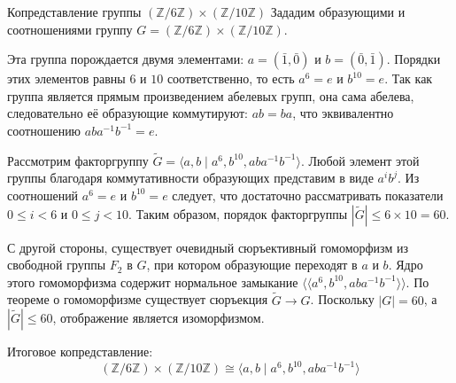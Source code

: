 \begin{Example}{Копредставление группы $(\mathbb{Z}/6\mathbb{Z}) \times (\mathbb{Z}/10\mathbb{Z})$}{}
	Зададим образующими и соотношениями группу $G = (\mathbb{Z}/6\mathbb{Z}) \times (\mathbb{Z}/10\mathbb{Z})$.

	Эта группа порождается двумя элементами: $a = (\bar{1}, \bar{0})$ и $b = (\bar{0}, \bar{1})$. Порядки этих элементов равны $6$ и $10$ соответственно, то есть $a^6 = e$ и $b^{10} = e$. Так как группа является прямым произведением абелевых групп, она сама абелева, следовательно её образующие коммутируют: $ab = ba$, что эквивалентно соотношению $aba^{-1}b^{-1} = e$.

	Рассмотрим факторгруппу $\widetilde{G} = \langle a, b \mid a^6, b^{10}, aba^{-1}b^{-1} \rangle$. Любой элемент этой группы благодаря коммутативности образующих представим в виде $a^i b^j$. Из соотношений $a^6=e$ и $b^{10}=e$ следует, что достаточно рассматривать показатели $0 \le i < 6$ и $0 \le j < 10$. Таким образом, порядок факторгруппы $|\widetilde{G}| \le 6 \times 10 = 60$.

	С другой стороны, существует очевидный сюръективный гомоморфизм из свободной группы $F_2$ в $G$, при котором образующие переходят в $a$ и $b$. Ядро этого гомоморфизма содержит нормальное замыкание $\langle\langle a^6, b^{10}, aba^{-1}b^{-1} \rangle\rangle$. По теореме о гомоморфизме существует сюръекция $\widetilde{G} \to G$. Поскольку $|G| = 60$, а $|\widetilde{G}| \le 60$, отображение является изоморфизмом.

	Итоговое копредставление:
	\[ (\mathbb{Z}/6\mathbb{Z}) \times (\mathbb{Z}/10\mathbb{Z}) \cong \langle a, b \mid a^6, b^{10}, aba^{-1}b^{-1} \rangle \]
\end{Example}
